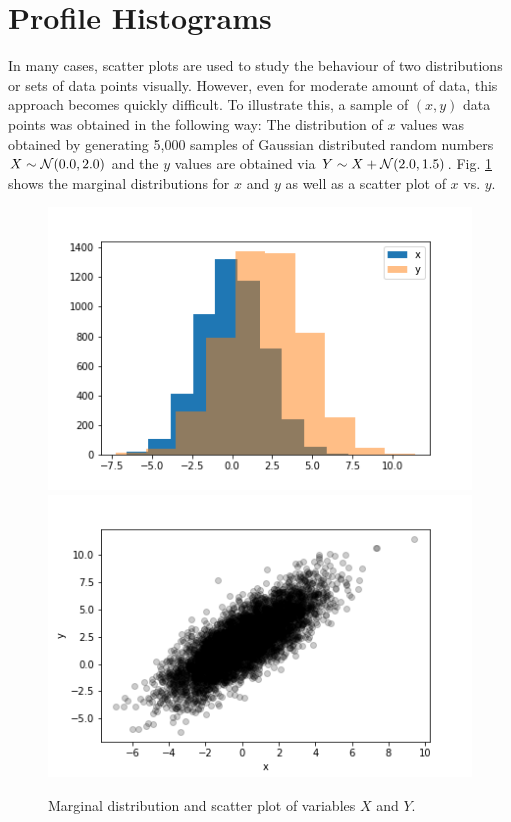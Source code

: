 \documentclass[BCOR=1mm, DIV=calc,10pt,
twoside=true,
twocolumn,
headings=normal]{scrartcl}
\newcommand{\fig}{Fig. }
\begin{document}



\appendix

\section{Profile Histograms}
\label{sec:profile}

In many cases, scatter plots are used to study the behaviour of two distributions or sets of data points visually. However, even for moderate amount of data, this approach becomes quickly difficult. To illustrate this, a sample of $(x,y)$ data points was obtained in the following way: The distribution of $x$ values was obtained by generating 5,000 samples of Gaussian distributed random numbers $X \sim {\cal N}(0.0,2.0)$ and the $y$ values are obtained via $Y \sim X +  {\cal N}(2.0,1.5)$. \fig \ref{fig:scatter} shows the marginal distributions for $x$ and $y$ as well as a scatter plot of $x$ vs. $y$.

\begin{figure}
\begin{center}
\includegraphics[scale=0.5]{../figures/marginal} \includegraphics[scale=0.5]{../figures/scatter}
\caption{\label{fig:scatter} Marginal distribution and scatter plot of variables $X$ and $Y$.}
\end{center}
\end{figure}
\end{document}
